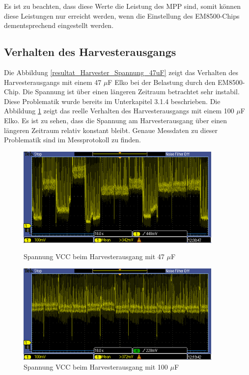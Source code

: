 Es ist zu beachten, dass diese Werte die Leistung des MPP sind, somit können diese Leistungen nur erreicht werden, wenn die Einstellung des EM8500-Chips dementsprechend eingestellt werden.


\subsection{Verhalten des Harvesterausgangs}

Die Abbildung \ref{resultat_Harvester_Spannung_47uF} zeigt das Verhalten des Harvesterausgangs mit einem 47 $\mu$F Elko bei der Belastung durch den EM8500-Chip. Die Spannung ist über einen längeren Zeitraum betrachtet sehr instabil. Diese Problematik wurde bereits im Unterkapitel 3.1.4 beschrieben. Die Abbildung \ref{resultat_Harvester_Spannung_100uF} zeigt das reelle Verhalten des Harvesterausgangs mit einem 100 $\mu$F Elko. Es ist zu sehen, dass die Spannung am Harvesterausgang über einen längeren Zeitraum relativ konstant bleibt. Genaue Messdaten zu dieser Problematik sind im Messprotokoll \cite{messung_harvester_elko} zu finden.

\begin{figure}[ht]
 \begin{minipage}[t]{0.5\textwidth}
    \includegraphics[width=0.9\textwidth]{4Resultate/imag/SpannungVCC_47uF.PNG} 
    \caption{Spannung VCC beim Harvesterausgang mit 47 $\mu$F}
    \label{resultat_Harvester_Spannung_47uF}
 \end{minipage}
 \begin{minipage}[t]{0.5\textwidth}
    \includegraphics[width=0.9\textwidth]{4Resultate/imag/SpannungVCC_100uF.png} 
    \caption{Spannung VCC beim Harvesterausgang mit 100 $\mu$F}
    \label{resultat_Harvester_Spannung_100uF}
 \end{minipage}
\end{figure}

